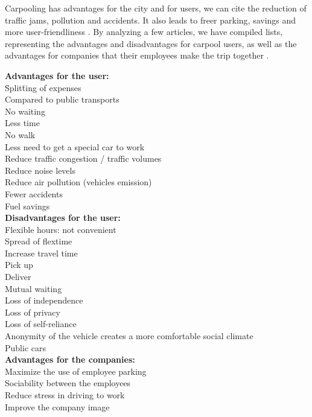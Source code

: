 \documentclass[12pt, a4paper, twoside]{memoir}
\newcommand{\newpar}{\vskip 0.2in \noindent}
\newcommand\tab[1][1cm]{\hspace*{#1}}
\begin{document}
	Carpooling has advantages for the city and for users, we can cite the reduction of traffic jams, pollution and accidents. It also leads to freer parking, savings and more user-friendliness \cite{berlingeriograal2017}.
	\newpar
	By analyzing a few articles, we have compiled lists, representing the advantages and disadvantages for carpool users, as well as the advantages for companies that their employees make the trip together \cite{huangmodels2000} \cite{onwubolunew2004} \cite{yanoptimization2011} \cite{bruglieripoliunipool:2011}.
	\begin{tabbing}
		{\bfseries Advantages for the user:}\\
		\tab \= Split\=ting of expenses \\
		\> Compared to public transports \> \\
		\> \> No waiting \\
		\> \> Less time \\
		\> \> No walk \\
		\> Less need to get a special car to work \> \\
		\> Reduce traffic congestion / traffic volumes \> \\
		\> Reduce noise levels \> \\
		\> Reduce air pollution (vehicles emission) \> \\
		\> Fewer accidents \> \\
		\> Fuel savings \> \\
		{\bfseries Disadvantages for the user:} \\
		\> Flexible hours: not convenient \\
		\> \> Spread of flextime \\
		\> Increase travel time \\
		\> \> Pick up \\
		\> \> Deliver \\
		\> \> Mutual waiting \\
		\> Loss of independence \\
		\> Loss of privacy \\
		\> Loss of self-reliance \\
		\> Anonymity of the vehicle creates a more comfortable social climate \\
		\> \> Public cars \\
		{\bfseries Advantages for the companies: }\\
		\> Maximize the use of employee parking \\
		\> Sociability between the employees \\
		\> Reduce stress in driving to work \\
		\> Improve the company image \\
	\end{tabbing}
	
\end{document}
